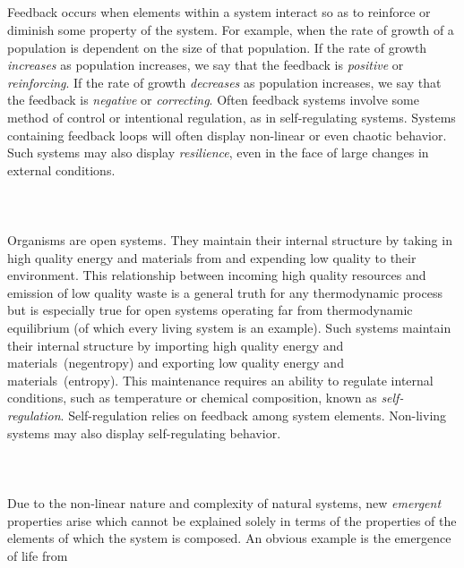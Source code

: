 \begin{svgraybox}
\\\\
\\\\
Feedback occurs when elements within a system interact so as
to reinforce or diminish some property of the system.
For example, when the rate of growth of a population
is dependent on the size of that population.
If the rate of growth \emph{increases} as population increases,
we say that the feedback is \emph{positive} or \emph{reinforcing}.
If the rate of growth \emph{decreases} as population increases,
we say that the feedback is \emph{negative} or \emph{correcting}.
Often feedback systems involve some method of control or 
intentional regulation,
as in self-regulating systems.
Systems containing feedback loops will often display
non-linear or even chaotic behavior. 
Such systems may also display \emph{resilience},
even in the face of large changes in external conditions.
\\\\
\\\\
Organisms are open systems.
They maintain their internal structure by taking in
high quality energy and materials from 
and expending low quality to their
environment. 
This relationship between 
incoming high quality resources and emission of low
quality waste is a general truth 
for any thermodynamic process but is especially
true for open systems operating far from 
thermodynamic equilibrium 
(of which every living system is an example). 
Such systems maintain their internal structure by
importing high quality energy and 
materials~(negentropy) and exporting low quality
energy and materials~(entropy).\cite{Schroedinger1947}
This maintenance requires an ability to regulate
internal conditions,
such as temperature or chemical composition, 
known as \emph{self-regulation}.
Self-regulation relies on feedback among system elements.
Non-living systems may also display self-regulating behavior.
\\\\
\\\\
Due to the non-linear nature and complexity of natural systems,
new \emph{emergent} properties arise which cannot
be explained solely in terms of the properties 
of the elements of which
the system is composed.
An obvious example is the emergence of life from

\end{svgraybox}

